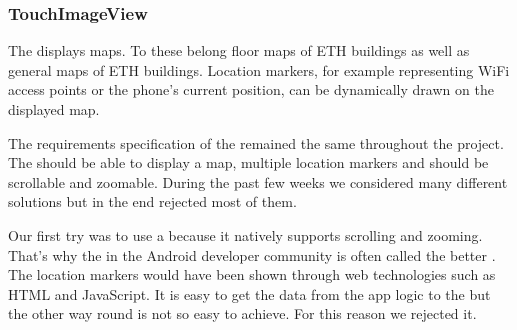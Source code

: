 \subsubsection{TouchImageView}
The  displays maps. To these belong floor maps of ETH buildings as well as general maps of ETH buildings. Location markers, for example representing WiFi access points or the phone's current position, can be dynamically drawn on the displayed map.

The requirements specification of the  remained the same throughout the project. The  should be able to display a map, multiple location markers and should be scrollable and zoomable. During the past few weeks we considered many different solutions but in the end rejected most of them.

Our first try was to use a  because it natively supports scrolling and zooming. That's why the  in the Android developer community is often called the better . The location markers would have been shown through web technologies such as HTML and JavaScript. It is easy to get the data from the app logic to the  but the other way round is not so easy to achieve. For this reason we rejected it. 

